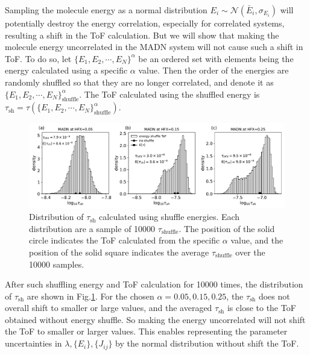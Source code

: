 \documentclass[letterpaper,12pt]{article}
\begin{document}
Sampling the molecule energy as a normal distribution $E_i \sim \mathcal{N}(\bar{E}_i, \sigma_{E_i})$ will potentially destroy the energy correlation, especially for correlated systems, resulting a shift in the ToF calculation.
But we will show that making the molecule energy uncorrelated in the MADN system will not cause such a shift in ToF. 
To do so, let $\{E_1, E_2, \cdots, E_N\}^{\alpha}$ be an ordered set with elements being the energy calculated using a specific $\alpha$ value. 
Then the order of the energies are randomly shuffled so that they are no longer correlated, and denote it as $\{E_1, E_2, \cdots, E_N\}^{\alpha}_{\text{shuffle}}$. The ToF calculated using the shuffled energy is $ \tau_{\text{sh}} = \tau(\{E_1, E_2, \cdots, E_N\}^{\alpha}_{\text{shuffle}}) $.
%
\begin{figure}[H]
    \centering
    \includegraphics[width=\textwidth]{figs/MADN_HFX/ToFx_shuffle.pdf}
    \caption{Distribution of $\tau_{\text{sh}}$ calculated using shuffle energies. Each distribution are a sample of 10000 $\tau_{\text{shuffle}}$. The position of the solid circle indicates the ToF calculated from the specific $\alpha$ value, and the position of the solid square indicates the average $\tau_{\text{shuffle}}$ over the 10000 samples.}
    \label{fig:ToF_shuffle_MADN}
\end{figure}
%
After such shuffling energy and ToF calculation for 10000 times, the distribution of $\tau_{\text{sh}}$ are shown in Fig.\ref{fig:ToF_shuffle_MADN}. 
For the chosen $\alpha=0.05, 0.15, 0.25$, the $\tau_{\text{sh}}$ does not overall shift to smaller or large values, and the averaged $\tau_{\text{sh}}$ is close to the ToF obtained without energy shuffle.
So making the energy uncorrelated will not shift the ToF to smaller or larger values.
This enables representing the parameter uncertainties in $\lambda, \{E_i\}, \{ J_{ij}\}$ by the normal distribution without shift the ToF.
\end{document}
